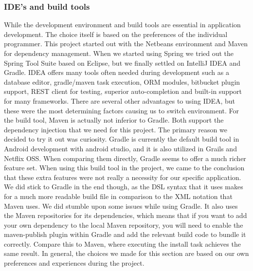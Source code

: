 \documentclass[12pt]{article}
\begin{document}
\begin{multicols}{2}
\subsubsection{IDE's and build tools}\label{sec:idebuild}
While the development environment and build tools are essential in application development. The choice itself is based on the preferences of the individual programmer. This project started out with the Netbeans environment and Maven for dependency management. When we started using Spring we tried out the Spring Tool Suite based on Eclipse, but we finally settled on IntelliJ IDEA and Gradle. IDEA offers many tools often needed during development such as a database editor, gradle/maven task execution, ORM modules, bitbucket plugin support, REST client for testing, superior auto-completion and built-in support for many frameworks. There are several other advantages to using IDEA, but these were the most determining factors causing us to switch environment. For the build tool, Maven is actually not inferior to Gradle. Both support the dependency injection that we need for this project. The primary reason we decided to try it out was curiosity. Gradle is currently the default build tool in Android development with android studio, and it is also utilized in Grails and Netflix OSS. When comparing them directly, Gradle seems to offer a much richer feature set. \cite{GradleVsMaven48:online} When using this build tool in the project, we came to the conclusion that these extra features were not really a necessity for our specific application. We did stick to Gradle in the end though, as the DSL syntax that it uses makes for a much more readable build file in comparison to the XML notation that Maven uses. We did stumble upon some issues while using Gradle. It also uses the Maven repositories for its dependencies, which means that if you want to add your own dependency to the local Maven repository, you will need to enable the maven-publish plugin within Gradle and add the relevant build code to bundle it correctly. Compare this to Maven, where executing the install task achieves the same result. In general, the choices we made for this section are based on our own preferences and experiences during the project.

\end{multicols}
\end{document}
